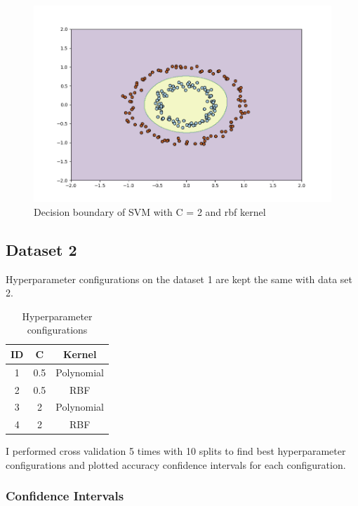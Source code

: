 \documentclass[12pt,a4paper, margin=1in]{article}
\begin{document}
\begin{figure}[H]
    \centering
    \includegraphics[scale=0.75]{svm-rbf-2}
    \caption{Decision boundary of SVM with C = 2 and rbf kernel}
\end{figure}

\pagebreak

\subsection{Dataset 2}

Hyperparameter configurations on the dataset 1 are kept the same with data set 2.

\begin{table}[H]
    \centering
    \begin{tabular}{|c|c|c|}
    \hline
    \textbf{ID} & \textbf{C} & \textbf{Kernel} \\ \hline
    1           & 0.5        & Polynomial           \\ \hline
    2           & 0.5        & RBF   \\ \hline
    3           & 2          & Polynomial         \\ \hline
    4           & 2          & RBF   \\ \hline
    \end{tabular}
    \caption{Hyperparameter configurations}
\end{table}

I performed cross validation 5 times with 10 splits to find best hyperparameter configurations and plotted accuracy confidence intervals for each configuration. 

\subsubsection{Confidence Intervals}
\end{document}
